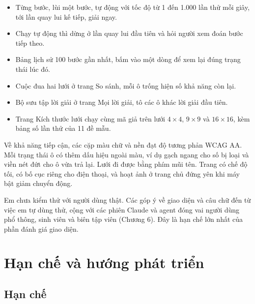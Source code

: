 \begin{itemize}
  \item Từng bước, lùi một bước, tự động với tốc độ từ 1 đến 1.000 lần thử mỗi giây, tới lần quay lui kế tiếp, giải ngay.
  \item Chạy tự động thì dừng ở lần quay lui đầu tiên và hỏi người xem đoán bước tiếp theo.
  \item Bảng lịch sử 100 bước gần nhất, bấm vào một dòng để xem lại đúng trạng thái lúc đó.
  \item Cuộc đua hai lưới ở trang So sánh, mỗi ô trống hiện số khả năng còn lại.
  \item Bộ sưu tập lời giải ở trang Mọi lời giải, tô các ô khác lời giải đầu tiên.
  \item Trang Kích thước lưới chạy cùng mã giả trên lưới \(4 \times 4\), \(9 \times 9\) và \(16 \times 16\), kèm bảng số lần thử của 11 đề mẫu.
\end{itemize}

Về khả năng tiếp cận, các cặp màu chữ và nền đạt độ tương phản WCAG AA. Mỗi trạng thái ô có thêm dấu hiệu ngoài màu, ví dụ gạch ngang cho số bị loại và viền nét đứt cho ô vừa trả lại. Lưới đi được bằng phím mũi tên. Trang có chế độ tối, có bố cục riêng cho điện thoại, và hoạt ảnh ở trang chủ đứng yên khi máy bật giảm chuyển động.

Em chưa kiểm thử với người dùng thật. Các góp ý về giao diện và câu chữ đến từ việc em tự dùng thử, cộng với các phiên Claude và agent đóng vai người dùng phổ thông, sinh viên và biên tập viên (Chương 6). Đây là hạn chế lớn nhất của phần đánh giá giao diện.

\section{Hạn chế và hướng phát triển}

\subsection*{Hạn chế}

